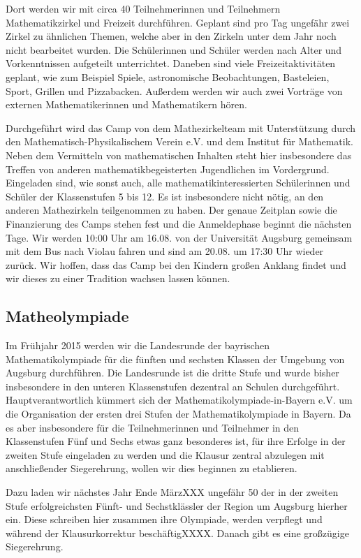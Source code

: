 \documentclass[12pt]{zettel}
\begin{document}
Dort werden wir mit circa 40 Teilnehmerinnen und Teilnehmern
Mathematikzirkel und Freizeit durchführen. Geplant sind pro Tag ungefähr
zwei Zirkel zu ähnlichen Themen, welche aber in den Zirkeln unter dem
Jahr noch nicht bearbeitet wurden. Die Schülerinnen und Schüler werden
nach Alter und Vorkenntnissen aufgeteilt unterrichtet. Daneben sind
viele Freizeitaktivitäten geplant, wie zum Beispiel Spiele,
astronomische Beobachtungen, Basteleien, Sport, Grillen und Pizzabacken.
Außerdem werden wir auch zwei Vorträge von externen Mathematikerinnen
und Mathematikern hören.

Durchgeführt wird das Camp von dem Mathezirkelteam mit Unterstützung
durch den Mathematisch-Physikalischem Verein e.V. und dem Institut für
Mathematik. Neben dem Vermitteln von mathematischen Inhalten steht hier
insbesondere das Treffen von anderen mathematikbegeisterten Jugendlichen
im Vordergrund. Eingeladen sind, wie sonst auch, alle
mathematikinteressierten Schülerinnen und Schüler der Klassenstufen 5
bis 12. Es ist insbesondere nicht nötig, an den anderen Mathezirkeln
teilgenommen zu haben. Der genaue Zeitplan sowie die Finanzierung des
Camps stehen fest und die Anmeldephase beginnt die nächsten Tage. Wir
werden 10:00 Uhr am 16.08. von der Universität Augsburg gemeinsam mit
dem Bus nach Violau fahren und sind am 20.08. um 17:30 Uhr wieder
zurück. Wir hoffen, dass das Camp bei den Kindern großen Anklang findet
und wir dieses zu einer Tradition wachsen lassen können.

\subsection{Matheolympiade}

Im Frühjahr 2015 werden wir die Landesrunde der bayrischen
Mathematikolympiade für die fünften und sechsten Klassen der Umgebung
von Augsburg durchführen. Die Landesrunde ist die dritte Stufe und wurde
bisher insbesondere in den unteren Klassenstufen dezentral an Schulen
durchgeführt. Hauptverantwortlich kümmert sich der
Mathematikolympiade-in-Bayern e.V. um die Organisation der ersten drei
Stufen der Mathematikolympiade in Bayern. Da es aber insbesondere für
die Teilnehmerinnen und Teilnehmer in den Klassenstufen Fünf und Sechs
etwas ganz besonderes ist, für ihre Erfolge in der zweiten Stufe
eingeladen zu werden und die Klausur zentral abzulegen mit
anschließender Siegerehrung, wollen wir dies beginnen zu etablieren.

Dazu laden wir nächstes Jahr Ende MärzXXX ungefähr 50 der in der zweiten
Stufe erfolgreichsten Fünft- und Sechstklässler der Region um Augsburg
hierher ein. Diese schreiben hier zusammen ihre Olympiade, werden
verpflegt und während der Klausurkorrektur beschäftigXXXX. Danach gibt
es eine großzügige Siegerehrung.
\end{document}
